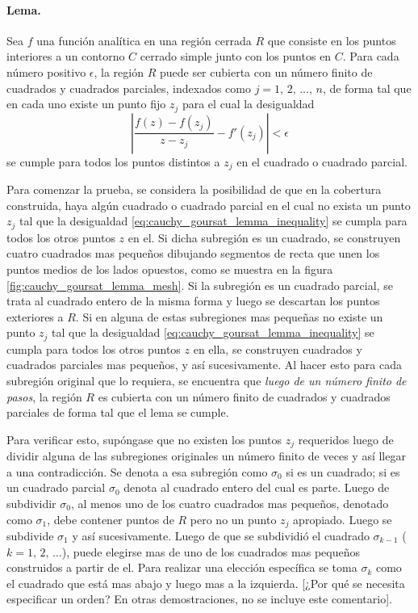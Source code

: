 \documentclass[a4paper]{report}
\begin{document}
\paragraph{Lema.} Sea \(f\) una función analítica en una región cerrada \(R\) que consiste en los puntos interiores a un contorno \(C\) cerrado simple junto con los puntos en \(C\). Para cada número positivo \(\epsilon\), la región \(R\) puede ser cubierta con un número finito de cuadrados y cuadrados parciales, indexados como \(j=1,\,2,\,\dots,\,n\), de forma tal que en cada uno existe un punto fijo \(z_j\) para el cual la desigualdad
\begin{equation}\label{eq:cauchy_goursat_lemma_inequality}
 \left|\frac{f(z)-f(z_j)}{z-z_j}-f'(z_j)\right|<\epsilon 
\end{equation}
se cumple para todos los puntos distintos a \(z_j\) en el cuadrado o cuadrado parcial.

Para comenzar la prueba, se considera la posibilidad de que en la cobertura construida, haya algún cuadrado o cuadrado parcial en el cual no exista un punto \(z_j\) tal que la desigualdad \ref{eq:cauchy_goursat_lemma_inequality} se cumpla para todos los otros puntos \(z\) en el. Si dicha subregión es un cuadrado, se construyen cuatro cuadrados mas pequeños dibujando segmentos de recta que unen los puntos medios de los lados opuestos, como se muestra en la figura \ref{fig:cauchy_goursat_lemma_mesh}. Si la subregión es un cuadrado parcial, se trata al cuadrado entero de la misma forma y luego se descartan los puntos exteriores a \(R\). Si en alguna de estas subregiones mas pequeñas no existe un punto \(z_j\) tal que la desigualdad \ref{eq:cauchy_goursat_lemma_inequality} se cumpla para todos los otros puntos \(z\) en ella, se construyen cuadrados y cuadrados parciales mas pequeños, y así sucesivamente. Al hacer esto para cada subregión original que lo requiera, se encuentra que \emph{luego de un número finito de pasos}, la región \(R\) es cubierta con un número finito de cuadrados y cuadrados parciales de forma tal que el lema se cumple.

Para verificar esto, supóngase que no existen los puntos \(z_j\) requeridos luego de dividir alguna de las subregiones originales un número finito de veces y así llegar a una contradicción. Se denota a esa subregión como \(\sigma_0\) si es un cuadrado; si es un cuadrado parcial \(\sigma_0\) denota al cuadrado entero del cual es parte. Luego de subdividir \(\sigma_0\), al menos uno de los cuatro cuadrados mas pequeños, denotado como \(\sigma_1\), debe contener puntos de \(R\) pero no un punto \(z_j\) apropiado. Luego se subdivide \(\sigma_1\) y así sucesivamente. Luego de que se subdividió el cuadrado \(\sigma_{k-1}\) (\(k=1,\,2,\,\dots\)), puede elegirse mas de uno de los cuadrados mas pequeños construidos a partir de el. Para realizar una elección específica se toma \(\sigma_k\) como el cuadrado que está mas abajo y luego mas a la izquierda. [¿Por qué se necesita especificar un orden? En otras demostraciones, no se incluye este comentario].
\end{document}
